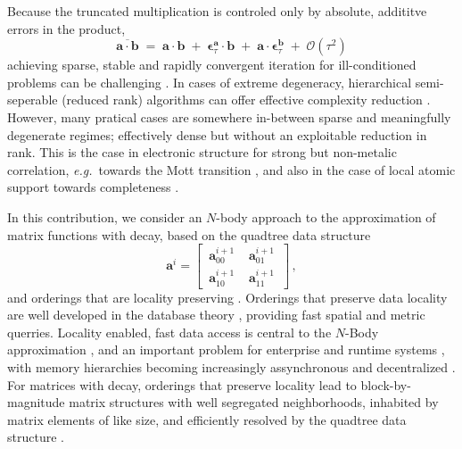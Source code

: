 \documentclass[letterpaper,twocolumn,amsmath,amsfont,amssymb,english,aps,jcp,preprintnumbers,groupaddress,nofootinbib,tightenlines]{revtex4}
\newcommand{\mat}[1]{\boldsymbol{#1}}
\begin{document}
Because the truncated multiplication is controled only by absolute, addititve errors in the  product,   
\begin{equation}
\overline{ \mat{a} \cdot \mat{b} }\; = \; \mat{a}\cdot\mat{b} \; +\; \mat{\epsilon}^{\mat{a}}_\tau \cdot \mat{b} \;+\;
 \mat{a} \cdot \mat{\epsilon}^{\mat{b}}_\tau  \; + \;   {\mathcal O}(\tau^2)
\end{equation}
achieving sparse, stable and rapidly convergent iteration for ill-conditioned problems can be challenging \cite{}.  In cases of 
extreme degeneracy,  hierarchical semi-seperable (reduced rank) algorithms  can offer effective complexity reduction \cite{}.
However, many pratical cases are somewhere in-between sparse and meaningfully degenerate regimes; effectively dense but without
an exploitable reduction in rank.  This is the case in electronic structure for strong but non-metalic correlation, 
{\em e.g.}~towards the Mott transition \cite{}, and also in the case of local atomic support towards completeness \cite{Others, Hutter, Gigi}. 

\pagebreak
In this contribution, we consider an $N$-body approach to the approximation of matrix functions with decay, 
based on the quadtree data structure \cite{wise, samet} 
\begin{equation}
\mat{a}^i = \begin{bmatrix} \,  \mat{a}^{i+1}_{00} \, & \,  \mat{a}^{i+1}_{01} \,  \\[0.2cm]  \, \mat{a}^{i+1}_{10} \,  & \,\mat{a}^{i+1}_{11} \, \end{bmatrix} \, ,
\end{equation}
and orderings that are locality preserving \cite{}.  Orderings that preserve data locality are well developed in the
database theory \cite{}, providing fast spatial and metric querries.  
Locality enabled, fast data access is central to the $N$-Body approximation \cite{}, and an important problem 
for enterprise \cite{} and runtime systems \cite{}, with memory hierarchies becoming increasingly assynchronous and decentralized \cite{cache}.  
For matrices with decay, orderings that preserve locality lead to block-by-magnitude matrix structures with well 
segregated neighborhoods, inhabited by matrix elements of like size, and efficiently resolved by the quadtree data structure \cite{}.
\end{document}
